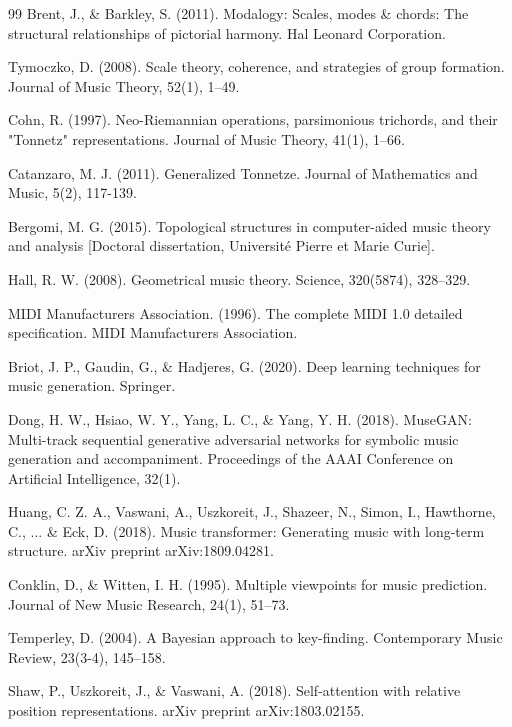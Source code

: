 \documentclass[12pt]{report}
\begin{document}
\begin{thebibliography}{99}
 Brent, J., \& Barkley, S. (2011). Modalogy: Scales, modes \& chords: The structural relationships of pictorial harmony. Hal Leonard Corporation.

 Tymoczko, D. (2008). Scale theory, coherence, and strategies of group formation. Journal of Music Theory, 52(1), 1–49.

 Cohn, R. (1997). Neo-Riemannian operations, parsimonious trichords, and their "Tonnetz" representations. Journal of Music Theory, 41(1), 1–66.

 Catanzaro, M. J. (2011). Generalized Tonnetze. Journal of Mathematics and Music, 5(2), 117-139.

 Bergomi, M. G. (2015). Topological structures in computer-aided music theory and analysis [Doctoral dissertation, Université Pierre et Marie Curie].

 Hall, R. W. (2008). Geometrical music theory. Science, 320(5874), 328–329.


  MIDI Manufacturers Association. (1996). The complete MIDI 1.0 detailed specification. MIDI Manufacturers Association.

 Briot, J. P., Gaudin, G., \& Hadjeres, G. (2020). Deep learning techniques for music generation. Springer.

 Dong, H. W., Hsiao, W. Y., Yang, L. C., \& Yang, Y. H. (2018). MuseGAN: Multi-track sequential generative adversarial networks for symbolic music generation and accompaniment. Proceedings of the AAAI Conference on Artificial Intelligence, 32(1).

 Huang, C. Z. A., Vaswani, A., Uszkoreit, J., Shazeer, N., Simon, I., Hawthorne, C., ... \& Eck, D. (2018). Music transformer: Generating music with long-term structure. arXiv preprint arXiv:1809.04281.

 Conklin, D., \& Witten, I. H. (1995). Multiple viewpoints for music prediction. Journal of New Music Research, 24(1), 51–73.

 Temperley, D. (2004). A Bayesian approach to key-finding. Contemporary Music Review, 23(3-4), 145–158.

 Shaw, P., Uszkoreit, J., \& Vaswani, A. (2018). Self-attention with relative position representations. arXiv preprint arXiv:1803.02155.


\end{thebibliography}
\end{document}
